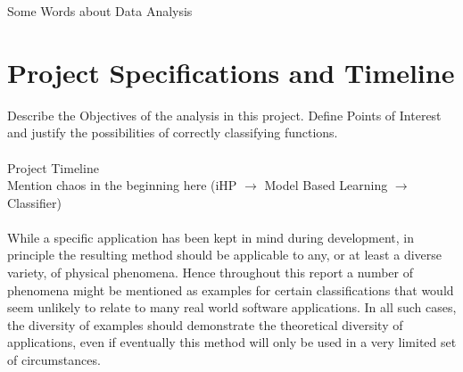 \documentclass[main.tex]{subfiles}
\begin{document}
  
  Some Words about Data Analysis
  
  \section{Project Specifications and Timeline}
    Describe the Objectives of the analysis in this project. Define Points of Interest and justify the possibilities of correctly classifying functions.
    \\\\
    Project Timeline \\
    Mention chaos in the beginning here (iHP $\to$ Model Based Learning $\to$ Classifier)
    \\\\
    While a specific application has been kept in mind during development, in principle the resulting method should be applicable to any, or at least a diverse variety, of physical phenomena. Hence throughout this report a number of phenomena might be mentioned as examples for certain classifications that would seem unlikely to relate to many real world software applications. In all such cases, the diversity of examples should demonstrate the theoretical diversity of applications, even if eventually this method will only be used in a very limited set of circumstances.
    
\end{document}
